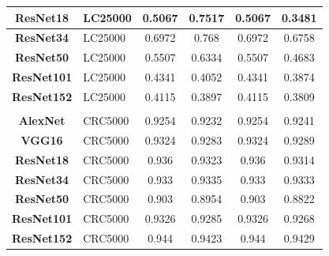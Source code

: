 \begin{table}[t!]
\begin{tabular}{|c|l|c|c|c|c|}
\textbf{ResNet18}      & LC25000                               & 0.5067                & 0.7517                & 0.5067                & 0.3481                \\ \hline
\textbf{ResNet34}      & LC25000                               & 0.6972                & 0.768                 & 0.6972                & 0.6758                \\ \hline
\textbf{ResNet50}      & LC25000                               & 0.5507                & 0.6334                & 0.5507                & 0.4683                \\ \hline
\textbf{ResNet101}     & LC25000                               & 0.4341                & 0.4052                & 0.4341                & 0.3874                \\ \hline
\textbf{ResNet152}     & LC25000                               & 0.4115                & 0.3897                & 0.4115                & 0.3809                \\ \hline
\multicolumn{1}{|l|}{} &                                       & \multicolumn{1}{l|}{} & \multicolumn{1}{l|}{} & \multicolumn{1}{l|}{} & \multicolumn{1}{l|}{} \\ \hline
\textbf{AlexNet}       & CRC5000                               & 0.9254                & 0.9232                & 0.9254                & 0.9241                \\ \hline
\textbf{VGG16}         & CRC5000                               & 0.9324                & 0.9283                & 0.9324                & 0.9289                \\ \hline
\textbf{ResNet18}      & CRC5000                               & 0.936                 & 0.9323                & 0.936                 & 0.9314                \\ \hline
\textbf{ResNet34}      & CRC5000                               & 0.933                 & 0.9335                & 0.933                 & 0.9333                \\ \hline
\textbf{ResNet50}      & CRC5000                               & 0.903                 & 0.8954                & 0.903                 & 0.8822                \\ \hline
\textbf{ResNet101}     & CRC5000                               & 0.9326                & 0.9285                & 0.9326                & 0.9268                \\ \hline
\textbf{ResNet152}     & CRC5000                               & 0.944                 & 0.9423                & 0.944                 & 0.9429                \\ \hline
\end{tabular}

\end{table}



